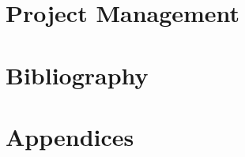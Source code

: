 \documentclass[11pt,a4paper,oneside]{report}
\begin{document}
\section{Project Management}



\section{Bibliography}


\section{Appendices}
\end{document}
